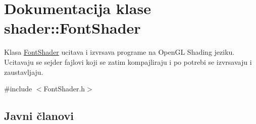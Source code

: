 \hypertarget{classshader_1_1FontShader}{}\section{Dokumentacija klase shader\+:\+:Font\+Shader}
\label{classshader_1_1FontShader}


Klasa \hyperlink{classshader_1_1FontShader}{Font\+Shader} ucitava i izvrsava programe na Open\+GL Shading jeziku. Ucitavaju se sejder fajlovi koji se zatim kompajliraju i po potrebi se izvrsavaju i zaustavljaju.  




{\ttfamily \#include $<$Font\+Shader.\+h$>$}

\subsection*{Javni članovi}
